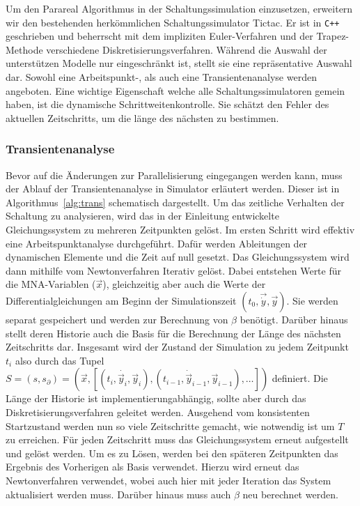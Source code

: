 Um den Parareal Algorithmus in der Schaltungssimulation einzusetzen, erweitern wir den bestehenden herkömmlichen Schaltungssimulator Tictac. Er ist in \texttt{C++} geschrieben und beherrscht mit dem impliziten Euler-Verfahren und der Trapez-Methode verschiedene Diskretisierungsverfahren. Während die Auswahl der unterstützen Modelle nur eingeschränkt ist, stellt sie eine repräsentative Auswahl dar. Sowohl eine Arbeitspunkt-, als auch eine Transientenanalyse werden angeboten. Eine wichtige Eigenschaft welche alle Schaltungssimulatoren gemein haben, ist die dynamische Schrittweitenkontrolle. Sie schätzt den Fehler des aktuellen Zeitschritts, um die länge des nächsten zu bestimmen.

\subsubsection*{Transientenanalyse}
Bevor auf die Änderungen zur Parallelisierung eingegangen werden kann, muss der Ablauf der Transientenanalyse in Simulator erläutert werden. Dieser ist in Algorithmus~\ref{alg:trans} schematisch dargestellt. Um das zeitliche Verhalten der Schaltung zu analysieren, wird das in der Einleitung entwickelte Gleichungssystem zu mehreren Zeitpunkten gelöst. Im ersten Schritt wird effektiv eine Arbeitspunktanalyse durchgeführt. Dafür werden Ableitungen der dynamischen Elemente und die Zeit auf null gesetzt. Das Gleichungssystem wird dann mithilfe vom Newtonverfahren Iterativ gelöst. Dabei entstehen Werte für die MNA-Variablen (\(\vec{x}\)), gleichzeitig aber auch die Werte der Differentialgleichungen am Beginn der Simulationszeit \((t_0,\vec{\dot{y}},\vec{y})\). Sie werden separat gespeichert und werden zur Berechnung von \(\beta\) benötigt. Darüber hinaus stellt deren Historie auch die Basis für die Berechnung der Länge des nächsten Zeitschritts dar. Insgesamt wird der Zustand der Simulation zu jedem Zeitpunkt \(t_i\) also durch das Tupel \(S = (s,s_\partial) = (\vec{x}, [(t_i,\dot{\vec{y}_i},\vec{y}_i),(t_{i-1},\dot{\vec{y}}_{i-1},\vec{y}_{i-1}),\dots])\) definiert. Die Länge der Historie ist implementierungabhängig, sollte aber durch das Diskretisierungsverfahren geleitet werden. Ausgehend vom konsistenten Startzustand werden nun so viele Zeitschritte gemacht, wie notwendig ist um \(T\) zu erreichen. Für jeden Zeitschritt muss das Gleichungssystem erneut aufgestellt und gelöst werden. Um es zu Lösen, werden bei den späteren Zeitpunkten das Ergebnis des Vorherigen als Basis verwendet. Hierzu wird erneut das Newtonverfahren verwendet, wobei auch hier mit jeder Iteration das System aktualisiert werden muss. Darüber hinaus muss auch \(\beta\) neu berechnet werden.

